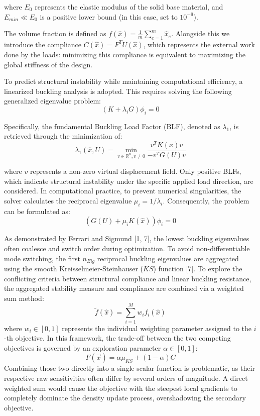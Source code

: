 \documentclass{article}
\begin{document}
where $E_0$ represents the elastic modulus of the solid base material, and $E_{min} \ll E_0$ is a positive lower bound (in this case, set to $10^{-9}$).

\vspace{\baselineskip}
The volume fraction is defined as $f(\hat{x}) = \frac{1}{m}\sum_{e=1}^m \hat{x}_e$. Alongside this we introduce the compliance $C(\hat{x}) = F^T U(\hat{x})$, which represents the external work done by the loads: minimizing this compliance is equivalent to maximizing the global stiffness of the design.

To predict structural instability while maintaining computational efficiency, a linearized buckling analysis is adopted. This requires solving the following generalized eigenvalue problem:
\begin{equation}
(K + \lambda_i G)\phi_i = 0
\end{equation}

Specifically, the fundamental Buckling Load Factor (BLF), denoted as $\lambda_1$, is retrieved through the minimization of:
\begin{equation}
\lambda_1(\hat{x}, U) = \min_{v \in \mathbb{R}^n, v \neq 0} \frac{v^T K(\hat{x}) v}{-v^T G(U) v}
\end{equation}

where $v$ represents a non-zero virtual displacement field. Only positive BLFs, which indicate structural instability under the specific applied load direction, are considered. In computational practice, to prevent numerical singularities, the solver calculates the reciprocal eigenvalue $\mu_i = 1/\lambda_i$. Consequently, the problem can be formulated as:
\begin{equation}
(G(U) + \mu_i K(\hat{x}))\phi_i = 0
\end{equation}

As demonstrated by Ferrari and Sigmund [1, 7], the lowest buckling eigenvalues often coalesce and switch order during optimization. To avoid non-differentiable mode switching, the first $n_{Eig}$ reciprocal buckling eigenvalues are aggregated using the smooth Kreisselmeier-Steinhauser ($KS$) function [7]. To explore the conflicting criteria between structural compliance and linear buckling resistance, the aggregated stability measure and compliance are combined via a weighted sum method:
\begin{equation}
\tilde{f}(\hat{x}) = \sum_{i=1}^M w_i f_i(\hat{x})
\end{equation}
where $w_i \in [0, 1]$ represents the individual weighting parameter assigned to the $i$-th objective. In this framework, the trade-off between the two competing objectives is governed by an exploration parameter $\alpha \in [0, 1]$:
\begin{equation}
F(\vec{x}) = \alpha \mu_{KS} + (1 - \alpha)C
\end{equation}
\noindent Combining those two directly into a single scalar function is problematic, as their respective raw sensitivities often differ by several orders of magnitude. A direct weighted sum would cause the objective with the steepest local gradients to completely dominate the density update process, overshadowing the secondary objective.
\end{document}

